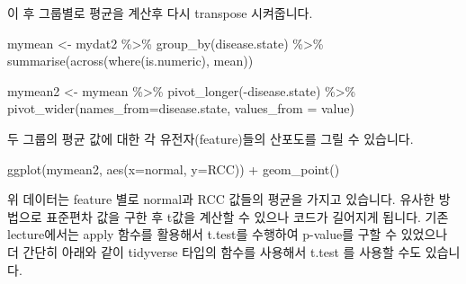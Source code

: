 \documentclass[
]{book}
\newenvironment{Shaded}{\begin{snugshade}}{\end{snugshade}}
\newcommand{\AttributeTok}[1]{\textcolor[rgb]{0.77,0.63,0.00}{#1}}
\newcommand{\CommentTok}[1]{\textcolor[rgb]{0.56,0.35,0.01}{\textit{#1}}}
\newcommand{\ControlFlowTok}[1]{\textcolor[rgb]{0.13,0.29,0.53}{\textbf{#1}}}
\newcommand{\FunctionTok}[1]{\textcolor[rgb]{0.00,0.00,0.00}{#1}}
\newcommand{\NormalTok}[1]{#1}
\newcommand{\OtherTok}[1]{\textcolor[rgb]{0.56,0.35,0.01}{#1}}
\newcommand{\SpecialCharTok}[1]{\textcolor[rgb]{0.00,0.00,0.00}{#1}}
\newcommand{\StringTok}[1]{\textcolor[rgb]{0.31,0.60,0.02}{#1}}
\begin{document}
이 후 그룹별로 평균을 계산후 다시 transpose 시켜줍니다.

\begin{Shaded}
\begin{Highlighting}[]
\NormalTok{mymean }\OtherTok{\textless{}{-}}\NormalTok{ mydat2 }\SpecialCharTok{\%\textgreater{}\%} 
  \FunctionTok{group\_by}\NormalTok{(disease.state) }\SpecialCharTok{\%\textgreater{}\%} 
  \FunctionTok{summarise}\NormalTok{(}\FunctionTok{across}\NormalTok{(}\FunctionTok{where}\NormalTok{(is.numeric), mean))}

\NormalTok{mymean2 }\OtherTok{\textless{}{-}}\NormalTok{ mymean }\SpecialCharTok{\%\textgreater{}\%} 
  \FunctionTok{pivot\_longer}\NormalTok{(}\SpecialCharTok{{-}}\NormalTok{disease.state) }\SpecialCharTok{\%\textgreater{}\%} 
  \FunctionTok{pivot\_wider}\NormalTok{(}\AttributeTok{names\_from=}\NormalTok{disease.state, }\AttributeTok{values\_from =}\NormalTok{ value)}
\end{Highlighting}
\end{Shaded}

두 그룹의 평균 값에 대한 각 유전자(feature)들의 산포도를 그릴 수 있습니다.

\begin{Shaded}
\begin{Highlighting}[]
\FunctionTok{ggplot}\NormalTok{(mymean2, }\FunctionTok{aes}\NormalTok{(}\AttributeTok{x=}\NormalTok{normal, }\AttributeTok{y=}\NormalTok{RCC)) }\SpecialCharTok{+}
  \FunctionTok{geom\_point}\NormalTok{()}
\end{Highlighting}
\end{Shaded}

위 데이터는 feature 별로 normal과 RCC 값들의 평균을 가지고 있습니다. 유사한 방법으로 표준편차 값을 구한 후 t값을 계산할 수 있으나 코드가 길어지게 됩니다. 기존 lecture에서는 apply 함수를 활용해서 t.test를 수행하여 p-value를 구할 수 있었으나 더 간단히 아래와 같이 tidyverse 타입의 함수를 사용해서 t.test 를 사용할 수도 있습니다.

\begin{Shaded}
\end{Shaded}
\end{document}
